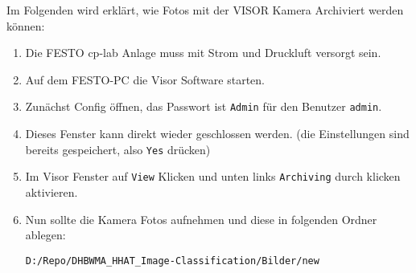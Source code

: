 Im Folgenden wird erklärt, wie Fotos mit der VISOR Kamera Archiviert werden können:

\begin{enumerate} 
    \item Die FESTO \ac{cp-lab} Anlage muss mit Strom und Druckluft versorgt sein.
    \item Auf dem FESTO-PC die Visor Software starten.
    \item Zunächst Config öffnen, das Passwort ist \texttt{Admin} für den Benutzer \texttt{admin}.
    \item Dieses Fenster kann direkt wieder geschlossen werden. (die Einstellungen sind bereits gespeichert, also \texttt{Yes} drücken)
    \item Im Visor Fenster auf \texttt{View} Klicken und unten links \texttt{Archiving} durch klicken aktivieren.
    \item Nun sollte die Kamera Fotos aufnehmen und diese in folgenden Ordner ablegen:
    
    \texttt{D:/Repo/DHBWMA\_HHAT\_Image-Classification/Bilder/new}

\end{enumerate}